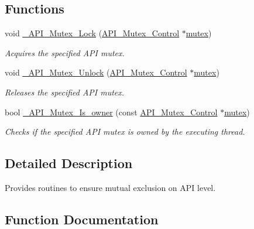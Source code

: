\subsection*{Functions}
\begin{DoxyCompactItemize}
\item 
void \mbox{\hyperlink{group__RTEMSScoreAPIMutex_ga57829ca494f1d866219c499eadb0ffc9}{\+\_\+\+A\+P\+I\+\_\+\+Mutex\+\_\+\+Lock}} (\mbox{\hyperlink{structAPI__Mutex__Control}{A\+P\+I\+\_\+\+Mutex\+\_\+\+Control}} $\ast$\mbox{\hyperlink{structmutex}{mutex}})
\begin{DoxyCompactList}\small\item\em Acquires the specified A\+PI mutex. \end{DoxyCompactList}\item 
void \mbox{\hyperlink{group__RTEMSScoreAPIMutex_ga64a430ae861d0ce7f63413e651fbe36d}{\+\_\+\+A\+P\+I\+\_\+\+Mutex\+\_\+\+Unlock}} (\mbox{\hyperlink{structAPI__Mutex__Control}{A\+P\+I\+\_\+\+Mutex\+\_\+\+Control}} $\ast$\mbox{\hyperlink{structmutex}{mutex}})
\begin{DoxyCompactList}\small\item\em Releases the specified A\+PI mutex. \end{DoxyCompactList}\item 
bool \mbox{\hyperlink{group__RTEMSScoreAPIMutex_ga0a01be1d7b28416e738a2b97ca3f611d}{\+\_\+\+A\+P\+I\+\_\+\+Mutex\+\_\+\+Is\+\_\+owner}} (const \mbox{\hyperlink{structAPI__Mutex__Control}{A\+P\+I\+\_\+\+Mutex\+\_\+\+Control}} $\ast$\mbox{\hyperlink{structmutex}{mutex}})
\begin{DoxyCompactList}\small\item\em Checks if the specified A\+PI mutex is owned by the executing thread. \end{DoxyCompactList}\end{DoxyCompactItemize}


\subsection{Detailed Description}
Provides routines to ensure mutual exclusion on A\+PI level. 



\subsection{Function Documentation}
\mbox{\label{group__RTEMSScoreAPIMutex_ga0a01be1d7b28416e738a2b97ca3f611d}} 
